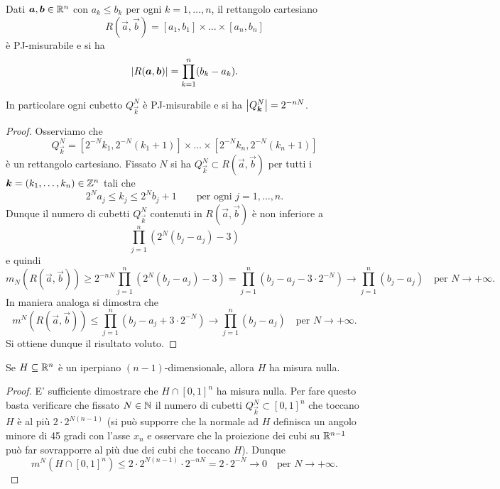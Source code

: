 \begin{exercise}
  \label{ex:misura_rettangolo}
Dati $\boldsymbol a,\boldsymbol b\in {\mathbb R}^n$ con $a_k\le b_k$ per ogni $k=1,\ldots,n$,
il rettangolo cartesiano
\[
  R(\vec a, \vec b) = [a_1,b_1]\times \dots \times [a_n,b_n]
\]  
è PJ-misurabile e si ha 
\[
    {\left|R(\boldsymbol a, \boldsymbol b)\right|} = \prod_{k=1}^n (b_k - a_k).
\]

In particolare ogni cubetto $Q^N_{\vec k}$ è PJ-misurabile e si ha 
${\left|Q^N_{\boldsymbol k}\right|} = 2^{-nN}$.
\end{exercise}
\begin{proof}
Osserviamo che
\[
  Q^N_{\vec k} = [2^{-N} k_1, 2^{-N}(k_1+1)] \times \dots \times [2^{-N} k_n, 2^{-N}(k_n+1)]
\]
è un rettangolo cartesiano.
Fissato $N$ si ha $Q^N_{\vec k} \subset R(\vec a,\vec b)$
per tutti i $\boldsymbol k = (k_1,\dots,k_n) \in {\mathbb Z}^n$ tali
che
\[
  2^N a_j \le k_j \le 2^N b_j + 1 \qquad \text{per ogni } j=1,\ldots,n.  
\]
Dunque il numero di cubetti $Q^N_{\vec k}$ contenuti in $R(\vec a,\vec b)$ 
è non inferiore a 
\[
  \prod_{j=1}^n (2^N(b_j-a_j)-3)
\]
e quindi 
\[
  m_N(R(\vec a,\vec b)) 
    \ge 2^{-nN} \prod_{j=1}^n (2^N(b_j-a_j)-3)
    = \prod_{j=1}^n (b_j - a_j - 3\cdot 2^{-N})
    \to \prod_{j=1}^n (b_j - a_j) \quad \text{per } N\to +\infty.
\]
In maniera analoga si dimostra che 
\[
  m^N(R(\vec a,\vec b)) 
  \le \prod_{j=1}^n (b_j - a_j + 3\cdot 2^{-N})
  \to \prod_{j=1}^n (b_j - a_j) \quad \text{per } N\to +\infty.
\]
Si ottiene dunque il risultato voluto.
\end{proof}

\begin{exercise}
  \label{ex:iperpiani_misura_nulla}
Se $H\subseteq {\mathbb R}^n$ è un iperpiano $(n-1)$-dimensionale, 
allora $H$ ha misura nulla.
\end{exercise}
\begin{proof}
E' sufficiente dimostrare che $H\cap [0,1]^n$ ha misura nulla.
Per fare questo basta verificare che fissato $N\in {\mathbb N}$ il numero 
di cubetti $Q^N_{\vec k}\subset [0,1]^n$ 
che toccano $H$ è al più $2\cdot 2^{N(n-1)}$ 
(si può supporre che la normale ad $H$ definisca un angolo minore di 45 gradi con 
l'asse $x_n$ e osservare che la proiezione dei cubi su ${\mathbb R}^{n-1}$ può far sovrapporre 
al più due dei cubi che toccano $H$). 
Dunque
\[
  m^N(H\cap [0,1]^n) \le 2\cdot 2^{N(n-1)} \cdot 2^{-nN} = 2\cdot 2^{-N} \to 0 \quad \text{per } N\to +\infty.
\]
\end{proof}

